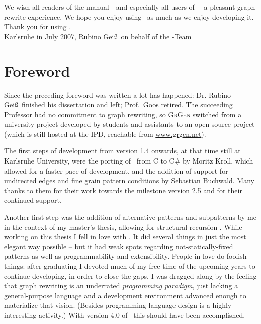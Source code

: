 We wish all readers of the manual---and especially all users of \GrG---a pleasant graph rewrite experience.
We hope you enjoy using \GrG\ as much as we enjoy developing it.\\[3ex]

Thank you for using \GrG.\\[6ex]

\noindent Karlsruhe in July 2007, Rubino Gei\ss~on behalf of the \GrG-Team

\pagebreak


\chapter*{Foreword}

Since the preceding foreword was written a lot has happened: Dr. Rubino Gei\ss~finished his dissertation \cite{DissRuby} and left; Prof.\ Goos retired.
The succeeding Professor had no commitment to graph rewriting,
so \textsc{GrGen} switched from a university project developed by students and assistants
to an open source project (which is still hosted at the IPD, reachable from \url{www.grgen.net}).

The first steps of development from version 1.4 onwards, at that time still at Karlsruhe University, were the porting of \GrG\ from C to C\# \cite{Kro:07} by Moritz Kroll, which allowed for a faster pace of development,
and the addition of support for undirected edges and fine grain pattern conditions \cite{SABuchwald:2008} by Sebastian Buchwald.
Many thanks to them for their work towards the milestone version 2.5 \cite{ExpressiveConvenientFast:2010} and for their continued support. 

Another first step was the addition of alternative patterns and subpatterns by me in the context of my master's thesis, allowing for structural recursion \cite{Jak:08,StructuralRecursion}. 
While working on this thesis I fell in love with \GrG.
It did several things in just the most elegant way possible -- but it had weak spots regarding not-statically-fixed patterns as well as programmability and extensibility.
People in love do foolish things: after graduating I devoted much of my free time of the upcoming years to continue developing, in order to close the gaps.
I was dragged along by the feeling that graph rewriting is an underrated \emph{programming paradigm}, just lacking a general-purpose language and a development environment advanced enough to materialize that vision. (Besides programming language design is a highly interesting activity.)
With version 4.0 of \GrG\ this should have been accomplished.\\[2ex]

